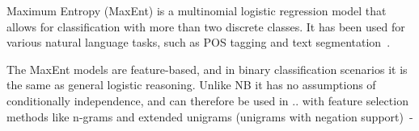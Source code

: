 Maximum Entropy (MaxEnt) is a multinomial logistic regression model that allows for classification with more than two discrete classes. It has been used for various natural language tasks, such as POS tagging and text segmentation~\citep{article:nigam}.

The MaxEnt models are feature-based, and in binary classification scenarios it is the same as general logistic reasoning. Unlike NB it has no assumptions of conditionally independence, and can therefore be used in .. with feature selection methods like n-grams and extended unigrams (unigrams with negation support)~\citep{article:go}-

